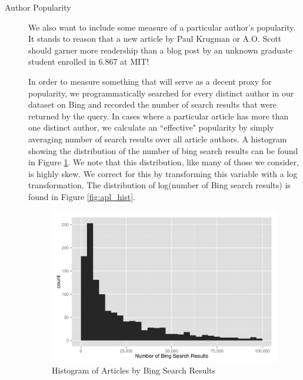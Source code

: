 \documentclass[fleqn,12pt]{SelfArx} %
\begin{document}
\begin{description}
	\item[Author Popularity] We also want to include some measure of a particular author's popularity. It stands to reason that a new article by Paul Krugman or A.O. Scott should garner more readership than a blog post by an unknown graduate student enrolled in 6.867 at MIT! 
	
	In order to measure something that will serve as a decent proxy for popularity, we programmatically searched for every distinct author in our dataset on Bing and recorded the number of search results that were returned by the query. In cases where a particular article has more than one distinct author, we calculate an ``effective" popularity by simply averaging number of search results over all article authors. A histogram showing the distribution of the number of bing search results can be found in Figure \ref{fig:ap_hist}. We note that this distribution, like many of those we consider, is highly skew. We correct for this by transforming this variable with a log transformation. The distribution of log(number of Bing search results) is found in Figure \ref{fig:apl_hist}.
	
\begin{figure}[ht]\centering
\includegraphics[width=\linewidth]{author_popularity_histogram.png}
\caption{Histogram of Articles by Bing Search Results}
\label{fig:ap_hist}
\end{figure}


\end{description}
\end{document}
